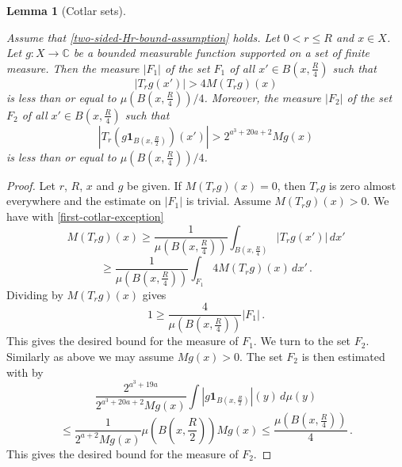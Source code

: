 \documentclass[10pt,a4paper]{article}
\theoremstyle{plain}
\newtheorem{lemma}[theorem]{Lemma}
\theoremstyle{definition}
\numberwithin{equation}{subsection}
\newcommand{\lean}[1]{}
\newcommand{\uses}[1]{}
\newcommand{\leanok}{}
\def\C{\mathbb{C}}
\begin{document}
\begin{lemma}[Cotlar sets]
\label{Cotlar-sets}
\leanok
\lean{cotlar_set_F₁, cotlar_set_F₂}
\uses{calderon-zygmund-weak-1-1}
Assume that \eqref{two-sided-Hr-bound-assumption} holds. Let $0<r\le R$ and  $x\in X$. Let $g:X\to\C$ be a bounded measurable function supported on a set of finite measure.
Then the measure $|F_1|$ of the set $F_1$ of all $x'\in B(x,\frac {R} 4)$ such that
\begin{equation}
\label{first-cotlar-exception}
    |T_rg(x')|> 4 M(T_rg)(x)
\end{equation}
is less than or equal to $\mu(B(x,\frac{R}{4}))/4$.
Moreover,  the measure $|F_2|$ of the set $F_2$ of all $x'\in
B(x,\frac {R} 4)$ such that
\begin{equation}
\label{second-cotlar-exception}
    |T_r(g\mathbf{1}_{B(x,\frac {R} 2)})(x')| > 2^{a^3 + 20a + 2} Mg(x)
\end{equation}
is less than or equal to  $\mu(B(x,\frac{R}{4}))/4$.
\end{lemma}

\begin{proof}
\leanok
Let $r$, $R$, $x$ and $g$ be given.
If $M(T_rg)(x)=0$, then $T_rg$ is zero almost everywhere and the estimate on $|F_1|$ is trivial.
Assume $M(T_rg)(x)>0$.
We have with \eqref{first-cotlar-exception}
\begin{equation}
    M(T_rg)(x)\ge
    \frac 1{\mu(B(x,\frac{R}{4}))}\int_{B(x,\frac{R}{4})}|T_rg(x')|\, dx'
\end{equation}
\begin{equation}
    \ge
    \frac 1{\mu(B(x,\frac{R}{4}))}\int_{F_1} 4 M(T_rg)(x)\, dx' \,.
\end{equation}
Dividing by $M(T_rg)(x)$ gives
\begin{equation}
    1\ge \frac{4}{\mu(B(x,\frac{R}{4}))} |F_1|\, .
\end{equation}
This gives the desired bound for the measure of $F_1$.
We turn to the set $F_2$. Similarly as above we may assume $Mg(x)>0$.
The set $F_2$ is then estimated with  by
\begin{equation}
   \frac {2^{a^3+19a}}{2^{a^3 + 20a + 2}Mg(x)}\int |g\mathbf{1}_{B(x,\frac {R}2)}|(y)\, d\mu(y)
\end{equation}
\begin{equation}
   \le \frac {1}{2^{a+2} Mg(x)}\mu(B(x,\frac {R}{2})) Mg(x) \le \frac{\mu(B(x,\frac {R}{4}))}{4} \,.
\end{equation}
This gives the desired bound for the measure of $F_2$.
\end{proof}
\end{document}
